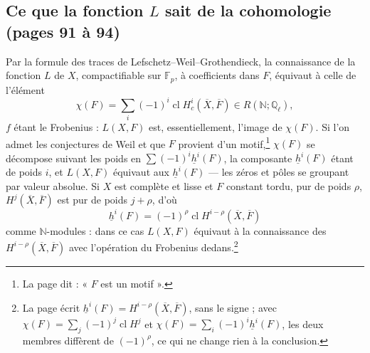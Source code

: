 \documentclass[11pt,a4paper]{article}
\begin{document}
\subsection*{Ce que la fonction $L$ sait de la cohomologie (pages 91 à 94)}

Par la formule des traces de Lefschetz--Weil--Grothendieck, la connaissance de la
fonction $L$ de $X$, compactifiable sur $\mathbb{F}_{p}$, à coefficients dans
$F$, équivaut à celle de l'élément
\[
\chi(F) = \sum_{i} (-1)^{i} \operatorname{cl} H^{i}_{c}(\overline{X}, \overline{F})
\in R(\mathbb{N}; \mathbb{Q}_{\ell}) ,
\]
$f$ étant le Frobenius : $L(X, F)$ est, essentiellement, l'image de $\chi(F)$.
Si l'on admet les conjectures de Weil et que $F$ provient d'un
motif,\footnote{La page dit : « $F$ est un motif ».} $\chi(F)$ se décompose
suivant les poids en $\sum (-1)^{i}\underline{h}^{i}(F)$, la composante
$\underline{h}^{i}(F)$ étant de poids $i$, et $L(X, F)$ équivaut aux
$\underline{h}^{i}(F)$ --- les zéros et pôles se groupant par valeur absolue. Si
$X$ est complète et lisse et $F$ constant tordu, pur de poids $\rho$,
$H^{j}(\overline{X}, \overline{F})$ est pur de poids $j + \rho$, d'où
\[
\underline{h}^{i}(F) = (-1)^{\rho}\operatorname{cl}H^{i-\rho}(\overline{X}, \overline{F})
\]
comme $\mathbb{N}$-modules : dans ce cas $L(X, F)$ équivaut à la connaissance
des $H^{i-\rho}(\overline{X}, \overline{F})$ avec l'opération du Frobenius
dedans.\footnote{La page écrit $\underline{h}^{i}(F) = H^{i-\rho}(\overline{X},
\overline{F})$, sans le signe ; avec $\chi(F) = \sum_{j}(-1)^{j}\operatorname{cl}
H^{j}$ et $\chi(F) = \sum_{i}(-1)^{i}\underline{h}^{i}(F)$, les deux membres
diffèrent de $(-1)^{\rho}$, ce qui ne change rien à la conclusion.}
\end{document}
